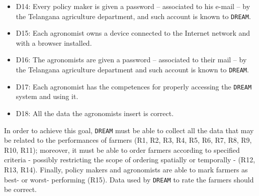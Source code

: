 \documentclass{article}
\begin{document}
\begin{itemize}
    \item D14: Every policy maker is given a password – associated to his e-mail – by the Telangana agriculture department, and such account is known to \verb|DREAM|.
  
    \item D15: Each agronomist owns a device connected to the Internet network and with a browser installed.
  
    \item D16: The agronomists are given a password – associated to their mail – by the Telangana agriculture department and such account is known to \verb|DREAM|.
  
    \item D17: Each agronomist has the competences for properly accessing the \verb|DREAM| system and using it.
   
    \item D18: All the data the agronomists insert is correct.
  
\end{itemize}

In order to achieve this goal, \verb|DREAM| must be able to collect all the data that may be related to the performances of farmers (R1, R2, R3, R4, R5, R6, R7, R8, R9, R10, R11); moreover, it must be able to order farmers according to specified criteria - possibly restricting the scope of ordering spatially or temporally - (R12, R13, R14). Finally, policy makers and agronomists are able to mark farmers as best- or worst- performing (R15).
Data used by \verb|DREAM| to rate the farmers should be correct.
\newline
\end{document}
